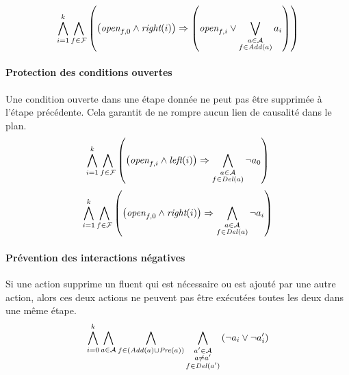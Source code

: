 \[ \bigwedge\limits_{\substack{i=1}}^{k}\bigwedge\limits_{\substack{f\in \mathcal{F}}}\left(\left(\textit{open}_{f,0} \wedge \textit{right}(i) \right) \Rightarrow \left(\textit{open}_{f,i} \vee \bigvee\limits_{\substack{a \in \mathcal{A} \\ f \in \mathit{Add}(a)}} a_{i}\right)\right)
\]

 \paragraph*{Protection des conditions ouvertes}

Une condition ouverte dans une étape donnée ne peut pas être supprimée à l'étape précédente. Cela garantit de ne rompre aucun lien de causalité dans le plan.
\[ \bigwedge\limits_{\substack{i=1}}^{k} \bigwedge\limits_{\substack{f\in \mathcal{F}}}\left(\left(\textit{open}_{f,i} \wedge \textit{left}(i) \right) \Rightarrow \bigwedge\limits_{\substack{a \in \mathcal{A}\\ f \in \mathit{Del}(a)}}\neg a_{0}\right) \]
\[ \bigwedge\limits_{\substack{i=1}}^{k} \bigwedge\limits_{\substack{f \in \mathcal{F}}} \left(\left(\textit{open}_{f,0} \wedge \textit{right}(i) \right) \Rightarrow \bigwedge\limits_{\substack{a \in \mathcal{A} \\ f \in \mathit{Del}(a)}}\neg a_{i}\right) \]

\paragraph*{Prévention des interactions négatives}

Si une action supprime un fluent qui est nécessaire ou est ajouté par une autre action, alors ces deux actions ne peuvent pas être exécutées toutes les deux dans une même étape.
\[ \bigwedge\limits_{\substack{i=0}}^{k} \bigwedge\limits_{\substack{a \in \mathcal{A}}} \bigwedge\limits_{\substack{f\in \left(\mathit{Add}(a) \cup \mathit{Pre}(a)\right)}} \bigwedge\limits_{\substack{a' \in \mathcal{A} \\ a \neq a' \\ f \in \mathit{Del}(a')}}\left(\neg a_{i} \vee \neg a'_{i}\right) \]
